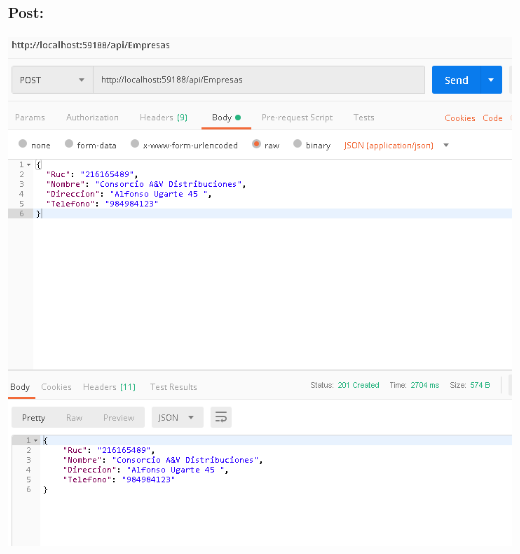 \begin{flushleft}
\begin{center}
	\end{center}
\textbf{}\\
\textbf{}\\
\textbf{}\\
\textbf{}\\
\textbf{}\\
\textbf{}\\
\textbf{}\\
\textbf{}\\
\textbf{}\\
\textbf{}\\
\textbf{}\\
\textbf{}\\
\textbf{}\\
\textbf{}\\
\textbf{}\\
\textbf{}\\
\textbf{}\\
\textbf{}\\
\textbf{}\\
\textbf{}\\
\textbf{}\\
\textbf{}\\
\textbf{Post:}\\
\begin{center}
	\includegraphics[width=19cm]{./Imagenes/post5} 
	\end{center}
\textbf{}\\


\end{flushleft}
